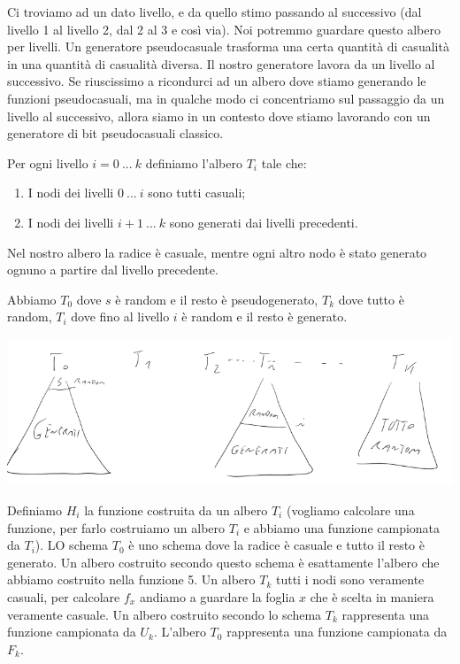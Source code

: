  Ci troviamo ad un dato livello, e da quello stimo passando al successivo (dal livello 1 al livello 2, dal 2 al 3 e così via). Noi potremmo guardare questo albero per livelli. Un generatore pseudocasuale trasforma una certa quantità di casualità in una quantità di casualità diversa. Il nostro generatore lavora da un livello al successivo. Se riuscissimo a ricondurci ad un albero dove stiamo generando le funzioni pseudocasuali, ma in qualche modo ci concentriamo sul passaggio da un livello al successivo, allora siamo in un contesto dove stiamo lavorando con un generatore di bit pseudocasuali classico. 

 Per ogni livello $i = 0 \ ... \ k$ definiamo l'albero $T_i$ tale che:
 \begin{enumerate}
     \item I nodi dei livelli $0 \ ... \ i$ sono tutti casuali;
     \item I nodi dei livelli $i+1 \ ... \ k$ sono generati dai livelli precedenti.
 \end{enumerate}

\noindent Nel nostro albero la radice è casuale, mentre ogni altro nodo è stato generato ognuno a partire dal livello precedente. 

Abbiamo $T_0$ dove $s$ è random e il resto è pseudogenerato, $T_k$ dove tutto è random, $T_i$ dove fino al livello $i$ è random e il resto è generato.
\begin{center}
    \includegraphics[width=1\textwidth]{images/fun5-4.png}
\end{center}

\noindent Definiamo $H_i$ la funzione costruita da un albero $T_i$ (vogliamo calcolare una funzione, per farlo costruiamo un albero $T_i$ e abbiamo una funzione campionata da $T_i$). LO schema $T_0$ è uno schema dove la radice è casuale e tutto il resto è generato. Un albero costruito secondo questo schema è esattamente l'albero che abbiamo costruito nella funzione 5. Un albero $T_k$ tutti i nodi sono veramente casuali, per calcolare $f_x$ andiamo a guardare la foglia $x$ che è scelta in maniera veramente casuale. Un albero costruito secondo lo schema $T_k$ rappresenta una funzione campionata da $U_k$. L'albero $T_0$ rappresenta una funzione campionata da $F_k$.

